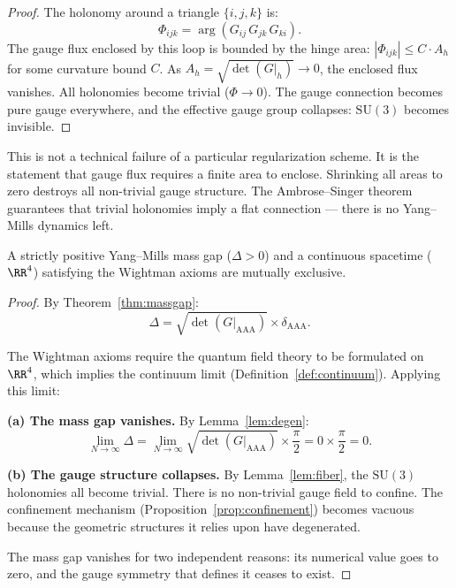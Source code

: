 \begin{proof}
The holonomy around a triangle $\{i, j, k\}$ is:
\begin{equation}
\Phi_{ijk} = \arg(G_{ij}\, G_{jk}\, G_{ki}).
\end{equation}
The gauge flux enclosed by this loop is bounded by the hinge area:
$|\Phi_{ijk}| \leq C \cdot A_h$ for some curvature bound $C$.
As $A_h = \sqrt{\det(G|_h)} \to 0$, the enclosed flux vanishes.
All holonomies become trivial ($\Phi \to 0$). The gauge connection
becomes pure gauge everywhere, and the effective gauge group collapses:
$\mathrm{SU}(3)$ becomes invisible.
\end{proof}

\begin{remark}
This is not a technical failure of a particular regularization scheme.
It is the statement that gauge flux requires a finite area to enclose.
Shrinking all areas to zero destroys all non-trivial gauge structure.
The Ambrose--Singer theorem \cite{Ambrose-Singer} guarantees that
trivial holonomies imply a flat connection --- there is no Yang--Mills
dynamics left.
\end{remark}

\begin{theorem}[No-Go]
\label{thm:nogo}
A strictly positive Yang--Mills mass gap ($\Delta > 0$) and a continuous
spacetime ($\RR^4$) satisfying the Wightman axioms are mutually
exclusive.
\end{theorem}

\begin{proof}
By Theorem~\ref{thm:massgap}:
\begin{equation}
\Delta = \sqrt{\det(G|_{\mathrm{AAA}})} \times \delta_{\mathrm{AAA}}.
\end{equation}

The Wightman axioms require the quantum field theory to be formulated on
$\RR^4$, which implies the continuum limit
(Definition~\ref{def:continuum}). Applying this limit:

\medskip\noindent
\textbf{(a) The mass gap vanishes.}
By Lemma~\ref{lem:degen}:
\begin{equation}
\lim_{N \to \infty} \Delta
= \lim_{N \to \infty} \sqrt{\det(G|_{\mathrm{AAA}})}
  \times \frac{\pi}{2}
= 0 \times \frac{\pi}{2} = 0.
\end{equation}

\textbf{(b) The gauge structure collapses.}
By Lemma~\ref{lem:fiber}, the $\mathrm{SU}(3)$ holonomies all become
trivial. There is no non-trivial gauge field to confine. The confinement
mechanism (Proposition~\ref{prop:confinement}) becomes vacuous because
the geometric structures it relies upon have degenerated.

\medskip\noindent
The mass gap vanishes for two independent reasons: its numerical value
goes to zero, and the gauge symmetry that defines it ceases to exist.
\end{proof}

